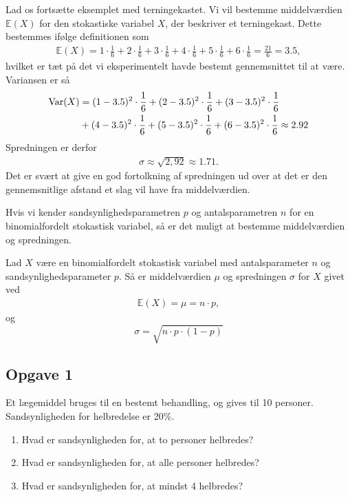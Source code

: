 \begin{exa}
Lad os fortsætte eksemplet med terningekastet. Vi vil bestemme middelværdien $\mathbb{E}(X)$ for den stokastiske variabel $X$, der beskriver et terningekast. Dette bestemmes ifølge definitionen som
\begin{align*}
\mathbb{E}(X) = 1\cdot \frac{1}{6} + 2\cdot \frac{1}{6}+3\cdot \frac{1}{6}+4\cdot \frac{1}{6}+5\cdot \frac{1}{6}+6\cdot \frac{1}{6} = \frac{21}{6} = 3.5,
\end{align*}
hvilket er tæt på det vi eksperimentelt havde bestemt gennemsnittet til at være. 
Variansen er så
\begin{align*}
\textnormal{Var}(X) &= (1-3.5)^2 \cdot \frac{1}{6} + (2-3.5)^2 \cdot \frac{1}{6} + (3-3.5)^2 \cdot \frac{1}{6}\\
 &+ (4-3.5)^2 \cdot \frac{1}{6} + (5-3.5)^2 \cdot \frac{1}{6} +(6-3.5)^2 \cdot \frac{1}{6} \approx 2.92
\end{align*}
Spredningen er derfor 
\begin{align*}
\sigma \approx \sqrt{2,92} \approx 1.71.
\end{align*}
Det er svært at give en god fortolkning af spredningen ud over at det er den gennemsnitlige afstand et slag vil have fra middelværdien. 
\end{exa}

Hvis vi kender sandsynlighedsparametren $p$ og antalsparametren $n$ for en binomialfordelt stokastisk variabel, så er det muligt at bestemme middelværdien og spredningen.
\begin{setn}
Lad $X$ være en binomialfordelt stokastisk variabel med antalsparameter $n$ og sandsynlighedsparameter $p$. Så er middelværdien $\mu$ og spredningen $\sigma$ for $X$ givet ved
\begin{align*}
\mathbb{E}(X) = \mu = n\cdot p,
\end{align*} 
og 
\[
\sigma = \sqrt{n\cdot p\cdot (1-p)}
\]
\end{setn}



\subsection*{Opgave 1}
Et lægemiddel bruges til en bestemt behandling, og gives til 10 personer. Sandsynligheden for helbredelse er 20$\%$. 
\begin{enumerate}[label=\roman*)]
	\item Hvad er sandsynligheden for, at to personer helbredes?
	\item Hvad er sandsynligheden for, at alle personer helbredes?
	\item Hvad er sandsynligheden for, at mindst 4 helbredes? 
\end{enumerate}

